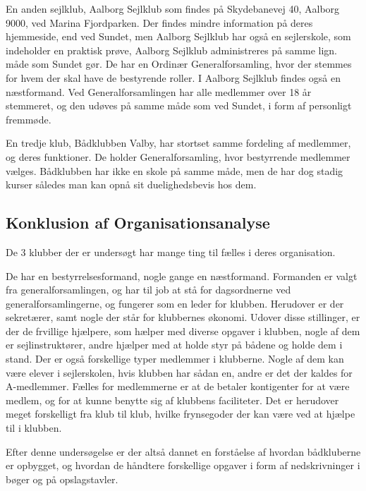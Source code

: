 En anden sejlklub, Aalborg Sejlklub som findes på Skydebanevej 40, Aalborg 9000, ved Marina Fjordparken. Der findes
mindre information på deres hjemmeside, end ved Sundet, men Aalborg Sejlklub har også en sejlerskole, som indeholder en
praktisk prøve,  Aalborg Sejlklub administreres på samme lign. måde som Sundet gør. De har en
Ordinær Generalforsamling, hvor der stemmes for hvem der skal have de bestyrende roller. I Aalborg Sejlklub findes også
en næstformand. Ved Generalforsamlingen har alle medlemmer over 18 år stemmeret, og den udøves på samme måde som ved
Sundet, i form af personligt fremmøde.\citep{AalborgSejlklub}

En tredje klub, Bådklubben Valby, har stortset samme fordeling af medlemmer, og deres funktioner. De holder
Generalforsamling, hvor bestyrrende medlemmer vælges. Bådklubben har ikke en skole på samme måde, men de har dog stadig
kurser således man kan opnå sit duelighedsbevis hos dem.\citep{BaadklubbenValby}


\subsection{Konklusion af Organisationsanalyse}

De 3 klubber der er undersøgt har mange ting til fælles i deres organisation.

De har en bestyrrelsesformand, nogle gange en næstformand. Formanden er valgt fra generalforsamlingen, og har til job at
stå for dagsordnerne ved generalforsamlingerne, og fungerer som en leder for klubben. Herudover er der sekretærer, samt
nogle der står for klubbernes økonomi. Udover disse stillinger, er der de frvillige hjælpere, som hælper med diverse
opgaver i klubben, nogle af dem er sejlinstruktører, andre hjælper med at holde styr på bådene og holde dem i stand. Der
er også forskellige typer medlemmer i klubberne. Nogle af dem kan være elever i sejlerskolen, hvis klubben har sådan en,
andre er det der kaldes for A-medlemmer. Fælles for medlemmerne er at de betaler kontigenter for at være medlem, og for
at kunne benytte sig af klubbens faciliteter. Det er herudover meget forskelligt fra klub til klub, hvilke frynsegoder
der kan være ved at hjælpe til i klubben.

Efter denne undersøgelse er der altså dannet en forståelse af hvordan bådkluberne er opbygget, og hvordan de håndtere
forskellige opgaver i form af nedskrivninger i bøger og på opslagstavler.

